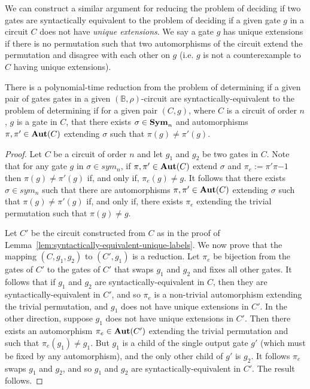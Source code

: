 \documentclass[../paper.tex]{subfiles}
\begin{document}
We can construct a similar argument for reducing the problem of deciding if two
gates are syntactically equivalent to the problem of deciding if a given gate
$g$ in a circuit $C$ does not have \emph{unique extensions}. We say a gate $g$
has unique extensions if there is no permutation such that two automorphisms of
the circuit extend the permutation and disagree with each other on $g$ (i.e. $g$
is not a counterexample to $C$ having unique extensions).

\begin{lem}
  There is a polynomial-time reduction from the problem of determining if a
  given pair of gates gates in a given $(\mathbb{B}, \rho)$-circuit are
  syntactically-equivalent to the problem of determining if for a given pair
  $(C, g)$, where $C$ is a circuit of order $n$, $g$ is a gate in $C$, that
  there exists $\sigma \in \text{\textbf{Sym}}_n$ and automorphisms $\pi, \pi' \in \text{\textbf{Aut}}(C)$
  extending $\sigma$ such that $\pi (g) \neq \pi' (g)$.
  \label{lem:syntactically-equivilent-unique-extensions}
\end{lem}
\begin{proof}
  Let $C$ be a circuit of order $n$ and let $g_1$ and $g_2$ be two gates in $C$.
  Note that for any gate $g$ in $\sigma \in sym_n$, if $\pi, \pi' \in \text{\textbf{Aut}}(C)$
  extend $\sigma$ and $\pi_e := \pi'\pi{-1}$ then $\pi(g) \neq \pi'(g)$ if, and
  only if, $\pi_e (g) \neq g$. It follows that there exists $\sigma \in sym_n$
  such that there are automorphisms $\pi, \pi' \in \text{\textbf{Aut}}(C)$ extending $\sigma$
  such that $\pi (g) \neq \pi'(g)$ if, and only if, there exists $\pi_e$
  extending the trivial permutation such that $\pi (g) \neq g$.

  Let $C'$ be the circuit constructed from $C$ as in the proof of
  Lemma~\ref{lem:syntactically-equivalent-unique-labels}. We now prove that the
  mapping $(C, g_1, g_2)$ to $(C', g_1)$ is a reduction. Let $\pi_e$ be
  bijection from the gates of $C'$ to the gates of $C'$ that swaps $g_1$ and
  $g_2$ and fixes all other gates. It follows that if $g_1$ and $g_2$ are
  syntactically-equivalent in $C$, then they are syntactically-equivalent in
  $C'$, and so $\pi_e$ is a non-trivial automorphism extending the trivial
  permutation, and $g_1$ does not have unique extensions in $C'$. In the other
  direction, suppose $g_1$ does not have unique extensions in $C'$. Then there
  exists an automorphism $\pi_e \in \text{\textbf{Aut}}(C')$ extending the trivial permutation
  and such that $\pi_e(g_1) \neq g_1$. But $g_1$ is a child of the single output
  gate $g'$ (which must be fixed by any automorphism), and the only other child
  of $g'$ is $g_2$. It follows $\pi_e$ swaps $g_1$ and $g_2$, and so $g_1$ and
  $g_2$ are syntactically-equivalent in $C'$. The result follows.
\end{proof}
\end{document}
